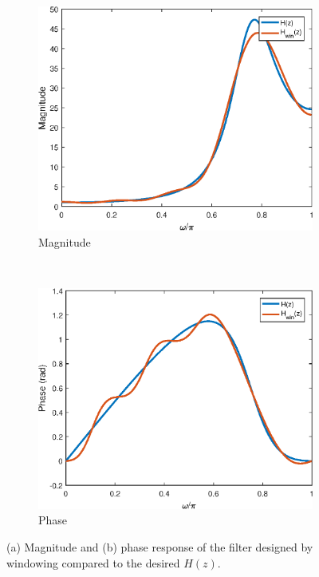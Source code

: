 \documentclass{article}
\begin{document}
\FloatBarrier
\begin{figure}[h!]
	\centering
	\begin{subfigure}[h!]{0.5\textwidth}
		\includegraphics[width=\textwidth]{eq_rect_win_mag.eps}
		\caption{Magnitude}
	\end{subfigure}%
	~ %
	\begin{subfigure}[h!]{0.5\textwidth}
		\includegraphics[width=\textwidth]{eq_rect_win_phase.eps}
		\caption{Phase}
	\end{subfigure}
	\caption{(a) Magnitude and (b) phase response of the filter designed by windowing compared to the desired $H(z)$.}
\end{figure}
\FloatBarrier
\end{document}
